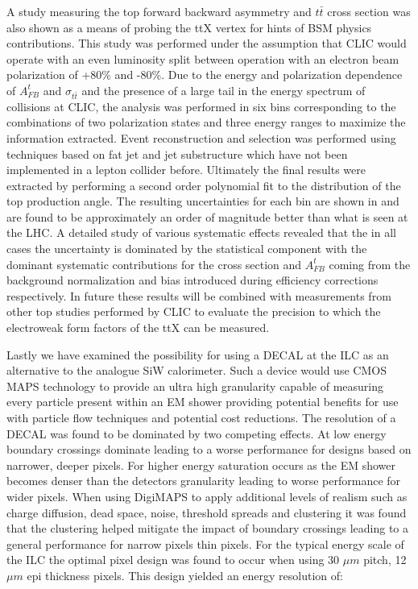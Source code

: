 A study measuring the top forward backward asymmetry and $t\bar{t}$ cross section was also shown as a means of probing the ttX vertex for hints of \ac{BSM} physics contributions. This study was performed under the assumption that \ac{CLIC} would operate with an even luminosity split between operation with an electron beam polarization of +80\% and -80\%. Due to the energy and polarization dependence of $A_{FB}^t$ and $\sigma_{t\bar{t}}$ and the presence of a large tail in the energy spectrum of collisions at \ac{CLIC}, the analysis was performed in six bins corresponding to the combinations of two polarization states and three energy ranges to maximize the information extracted. Event reconstruction and selection was performed using techniques based on fat jet and jet substructure which have not been implemented in a lepton collider before. Ultimately the final results were extracted by performing a second order polynomial fit to the distribution of the top production angle. The resulting uncertainties for each bin are shown in  and are found to be approximately an order of magnitude better than what is seen at the \ac{LHC}\cite{Bai:2011uk}. A detailed study of various systematic effects revealed that the in all cases the uncertainty is dominated by the statistical component with the dominant systematic contributions for the cross section and $A_{FB}^t$ coming from the background normalization and bias introduced during efficiency corrections respectively. In future these results will be combined with measurements from other top studies performed by \ac{CLIC} to evaluate the precision to which the electroweak form factors of the ttX can be measured.

Lastly we have examined the possibility for using a \ac{DECAL} at the \ac{ILC} as an alternative to the analogue SiW calorimeter. Such a device would use \ac{CMOS} \ac{MAPS} technology to provide an ultra high granularity capable of measuring every particle present within an \ac{EM} shower providing potential benefits for use with particle flow techniques and potential cost reductions. The resolution of a \ac{DECAL} was found to be dominated by two competing effects. At low energy boundary crossings dominate leading to a worse performance for designs based on narrower, deeper pixels. For higher energy saturation occurs as the EM shower becomes denser than the detectors granularity leading to worse performance for wider pixels. When using DigiMAPS to apply additional levels of realism such as charge diffusion, dead space, noise, threshold spreads and clustering it was found that the clustering helped mitigate the impact of boundary crossings leading to a general performance for narrow pixels thin pixels. For the typical energy scale of the \ac{ILC} the optimal pixel design was found to occur when using 30 $\mu m$ pitch, 12 $\mu m$ epi thickness pixels. This design yielded an energy resolution of:

